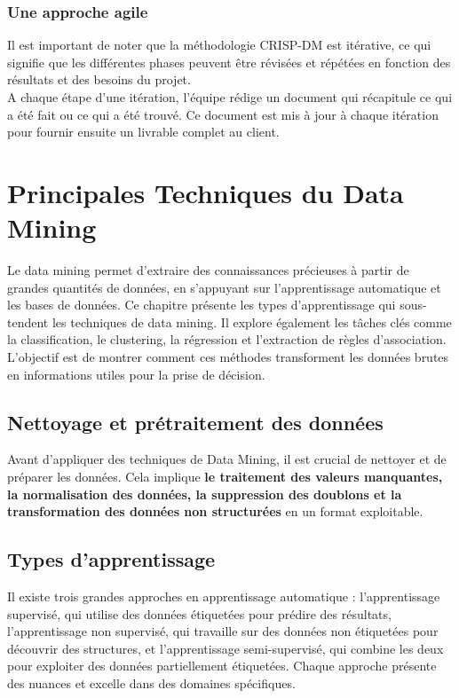 \documentclass[a4paper,12pt]{article}
\begin{document}
        \subsubsection{Une approche agile }
        Il est important de noter que la méthodologie CRISP-DM est itérative, ce qui signifie que les différentes phases peuvent être révisées et répétées en fonction des résultats et des besoins du projet.\\
        A chaque étape d’une itération, l’équipe rédige un document qui récapitule ce qui a été fait ou ce qui a été trouvé. Ce document est mis à jour à chaque itération pour fournir ensuite un livrable complet au client.

        
\section{ Principales Techniques du Data Mining}

    

    Le data mining permet d’extraire des connaissances précieuses à partir de grandes quantités de données, en s’appuyant sur l’apprentissage automatique et les bases de données. Ce chapitre présente les types d’apprentissage qui sous-tendent les techniques de data mining. Il explore également les tâches clés comme la classification, le clustering, la régression et l’extraction de règles d’association. L’objectif est de montrer comment ces méthodes transforment les données brutes en informations utiles pour la prise de décision.

    \subsection{Nettoyage et prétraitement des données }
    
    Avant d’appliquer des techniques de Data Mining, il est crucial de nettoyer et de préparer les données. Cela implique \textbf{le traitement des valeurs manquantes, la normalisation des données, la suppression des doublons et la transformation des données non structurées} en un format exploitable.

    
    \subsection{Types d’apprentissage}
    
        Il existe trois grandes approches en apprentissage automatique : l'apprentissage supervisé, qui utilise des données étiquetées pour prédire des résultats, l'apprentissage non supervisé, qui travaille sur des données non étiquetées pour découvrir des structures, et l'apprentissage semi-supervisé, qui combine les deux pour exploiter des données partiellement étiquetées. Chaque approche présente des nuances et excelle dans des domaines spécifiques.
        
\end{document}
